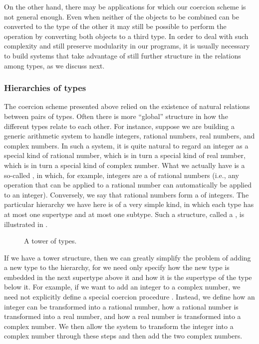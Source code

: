 On the other hand, there may be applications for which our coercion scheme is not general enough.
Even when neither of the objects to be combined can be converted to the type of the other it may still be possible to perform the operation by converting both objects to a third type.
In order to deal with such complexity and still preserve modularity in our programs, it is usually necessary to build systems that take advantage of still further structure in the relations among types, as we discuss next.



\subsubsection*{Hierarchies of types}

The coercion scheme presented above relied on the existence of natural relations between pairs of types.
Often there is more “global” structure in how the different types relate to each other.
For instance, suppose we are building a generic arithmetic system to handle integers, rational numbers, real numbers, and complex numbers.
In such a system, it is quite natural to regard an integer as a special kind of rational number, which is in turn a special kind of real number, which is in turn a special kind of complex number.
What we actually have is a so-called , in which, for example, integers are a  of rational numbers (i.e., any operation that can be applied to a rational number can automatically be applied to an integer).
Conversely, we say that rational numbers form a  of integers.
The particular hierarchy we have here is of a very simple kind, in which each type has at most one supertype and at most one subtype.
Such a structure, called a , is illustrated in .

\begin{figure}[tb]
	\centering
	
	\caption{A tower of types.}
	\label{Figure 2.25}
\end{figure}

If we have a tower structure, then we can greatly simplify the problem of adding a new type to the hierarchy, for we need only specify how the new type is embedded in the next supertype above it and how it is the supertype of the type below it.
For example, if we want to add an integer to a complex number, we need not explicitly define a special coercion procedure .
Instead, we define how an integer can be transformed into a rational number, how a rational number is transformed into a real number, and how a real number is transformed into a complex number.
We then allow the system to transform the integer into a complex number through these steps and then add the two complex numbers.


